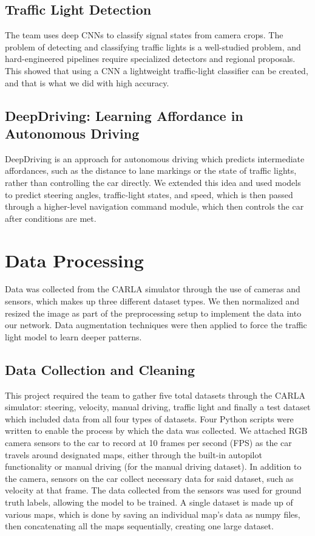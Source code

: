 \documentclass{article} %
\begin{document}
\subsection{Traffic Light Detection \citep{3.4Ref}}
The team uses deep CNNs to classify signal states from camera crops. The problem of detecting and classifying traffic lights is a 
well-studied problem, and hard-engineered pipelines require specialized detectors and regional proposals. This showed that using a 
CNN a lightweight traffic-light classifier can be created, and that is what we did with high accuracy.  

\subsection{DeepDriving: Learning Affordance in Autonomous Driving \citep{3.5Ref}}
DeepDriving is an approach for autonomous driving which predicts intermediate affordances, such as the distance to 
lane markings or the state of traffic lights, rather than controlling the car directly. We extended this idea and used 
models to predict steering angles, traffic-light states, and speed, which is then passed through a higher-level navigation 
command module, which then controls the car after conditions are met.


\section{Data Processing}

Data was collected from the CARLA simulator through the use of cameras and sensors, which makes up three different dataset types. We then normalized and resized the image as part of the preprocessing setup to implement the data into our network. Data augmentation techniques were then applied to force the traffic light model to learn deeper patterns. 

\subsection{Data Collection and Cleaning}
This project required the team to gather five total datasets through the CARLA simulator: steering, velocity, manual driving, traffic light and finally a test dataset which included data from all four types of datasets. Four Python scripts were written to enable the process by which the data was collected. We attached RGB camera sensors to the car to record at 10 frames per second (FPS) as the car travels around designated maps, either through the built-in autopilot functionality or manual driving (for the manual driving dataset). In addition to the camera, sensors on the car collect necessary data for said dataset, such as velocity at that frame. The data collected from the sensors was used for ground truth labels, allowing the model to be trained. A single dataset is made up of various maps, which is done by saving an individual map’s data as numpy files, then concatenating all the maps sequentially, creating one large dataset. 
\end{document}
